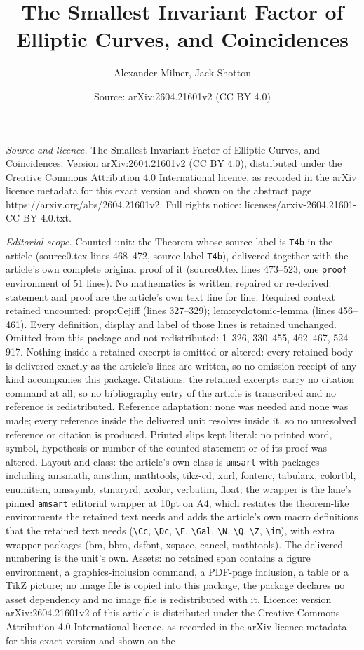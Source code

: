 \documentclass[10pt,a4paper]{amsart}
\title[The Smallest Invariant Factor of Elliptic Curves, and Coinci]{The Smallest Invariant Factor of Elliptic Curves, and Coincidences}
\author{Alexander Milner, Jack Shotton}
\date{Source: arXiv:2604.21601v2 (CC BY 4.0)}
\begin{document}
\maketitle

\noindent\emph{Source and licence.} The Smallest Invariant Factor of Elliptic Curves, and Coincidences. Version arXiv:2604.21601v2 (CC BY 4.0), distributed under the Creative Commons Attribution 4.0 International licence, as recorded in the arXiv licence metadata for this exact version and shown on the abstract page https://arxiv.org/abs/2604.21601v2. Full rights notice: licenses/arxiv-2604.21601-CC-BY-4.0.txt.\par\smallskip

\noindent\textit{Editorial scope.} Counted unit: the Theorem whose source label is \texttt{T4b} in the article (source0.tex lines 468--472, source label \texttt{T4b}), delivered together with the article's own complete original proof of it (source0.tex lines 473--523, one \texttt{proof} environment of 51 lines). No mathematics is written, repaired or re-derived: statement and proof are the article's own text line for line. Required context retained uncounted: prop:Cejiff (lines 327--329); lem:cyclotomic-lemma (lines 456--461). Every definition, display and label of those lines is retained unchanged. Omitted from this package and not redistributed: 1--326, 330--455, 462--467, 524--917. Nothing inside a retained excerpt is omitted or altered: every retained body is delivered exactly as the article's lines are written, so no omission receipt of any kind accompanies this package. Citations: the retained excerpts carry no citation command at all, so no bibliography entry of the article is transcribed and no reference is redistributed. Reference adaptation: none was needed and none was made; every reference inside the delivered unit resolves inside it, so no unresolved reference or citation is produced. Printed slips kept literal: no printed word, symbol, hypothesis or number of the counted statement or of its proof was altered. Layout and class: the article's own class is \texttt{amsart} with packages including amsmath, amsthm, mathtools, tikz-cd, xurl, fontenc, tabularx, colortbl, enumitem, amssymb, stmaryrd, xcolor, verbatim, float; the wrapper is the lane's pinned \texttt{amsart} editorial wrapper at 10pt on A4, which restates the theorem-like environments the retained text needs and adds the article's own macro definitions that the retained text needs (\texttt{\textbackslash Cc}, \texttt{\textbackslash Dc}, \texttt{\textbackslash E}, \texttt{\textbackslash Gal}, \texttt{\textbackslash N}, \texttt{\textbackslash Q}, \texttt{\textbackslash Z}, \texttt{\textbackslash im}), with extra wrapper packages (bm, bbm, dsfont, xspace, cancel, mathtools). The delivered numbering is the unit's own. Assets: no retained span contains a figure environment, a graphics-inclusion command, a PDF-page inclusion, a table or a TikZ picture; no image file is copied into this package, the package declares no asset dependency and no image file is redistributed with it. Licence: version arXiv:2604.21601v2 of this article is distributed under the Creative Commons Attribution 4.0 International licence, as recorded in the arXiv licence metadata for this exact version and shown on the 
\end{document}
